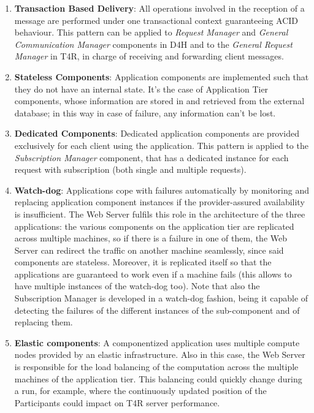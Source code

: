 \begin{enumerate}
    \item \textbf{Transaction Based Delivery}: All operations involved in the reception of a message are performed under one transactional context guaranteeing ACID behaviour. This pattern can be applied to \emph{Request Manager} and \emph{General Communication Manager} components in D4H and to the \emph{General Request Manager} in T4R, in charge of receiving and forwarding client messages.
    \item \textbf{Stateless Components}: Application components are implemented such that they do not have an internal state. It's the case of Application Tier components, whose information are stored in and retrieved from the external database; in this way in case of failure, any information can't be lost.
    \item \textbf{Dedicated Components}: Dedicated application components are provided exclusively for each client using the application. This pattern is applied to the \emph{Subscription Manager} component, that has a dedicated instance for each request with subscription (both single and multiple requests).
    \item \textbf{Watch-dog}: Applications cope with failures automatically by monitoring and replacing application component instances if the provider-assured availability is insufficient. The Web Server fulfils this role in the architecture of the three applications: the various components on the application tier are replicated across multiple machines, so if there is a failure in one of them, the Web Server can redirect the traffic on another machine seamlessly, since said components are stateless. Moreover, it is replicated itself so that the applications are guaranteed to work even if a machine fails (this allows to have multiple instances of the watch-dog too). Note that also the Subscription Manager is developed in a watch-dog fashion, being it capable of detecting the failures of the different instances of the sub-component and of replacing them.
    \item \textbf{Elastic components}: A componentized application uses multiple compute nodes provided by an elastic infrastructure. Also in this case, the Web Server is responsible for the load balancing of the computation across the multiple machines of the application tier. This balancing could quickly change during a run, for example, where the continuously updated position of the Participants could impact on T4R server performance.
\end{enumerate}
